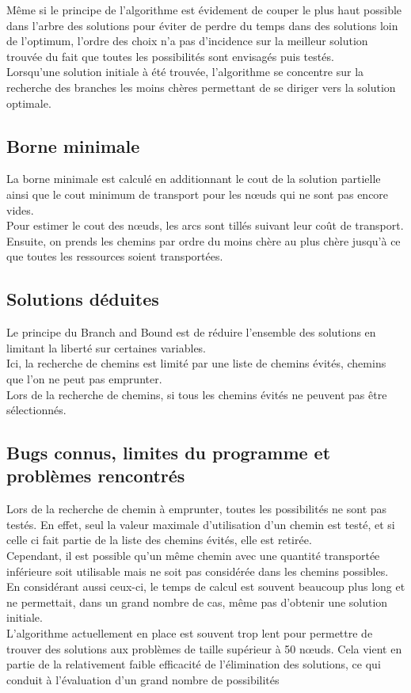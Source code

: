 \documentclass[a4paper, 12pt]{report}
\begin{document}
Même si le principe de l'algorithme est évidement de couper le plus haut possible dans l'arbre des solutions 
pour éviter de perdre du temps dans des solutions loin de l'optimum, 
l'ordre des choix n'a pas d'incidence sur la meilleur solution trouvée 
du fait que toutes les possibilités sont envisagés puis testés.\\

Lorsqu'une solution initiale à été trouvée, l'algorithme se concentre sur la recherche des branches les moins chères
permettant de se diriger vers la solution optimale.

\subsection{Borne minimale}
La borne minimale est calculé en additionnant le cout de la solution partielle ainsi que le cout minimum de transport pour les nœuds qui ne sont pas encore vides. \\
Pour estimer le cout des nœuds, les arcs sont tillés suivant leur coût de transport. 
Ensuite, on prends les chemins par ordre du moins chère au plus chère
jusqu'à ce que toutes les ressources soient transportées. 

\subsection{Solutions déduites}
Le principe du Branch and Bound est de réduire l'ensemble des solutions en limitant la liberté sur certaines variables. \\
Ici, la recherche de chemins est limité par une liste de chemins évités, chemins que l'on ne peut pas emprunter.\\
Lors de la recherche de chemins, si tous les chemins évités ne  peuvent pas être sélectionnés. 

\subsection{Bugs connus, limites du programme et problèmes rencontrés}
Lors de la recherche de chemin à emprunter, toutes les possibilités ne sont pas testés.
En effet, seul la valeur maximale d'utilisation d'un chemin est testé, 
et si celle ci fait partie de la liste des chemins évités, elle est retirée. \\
Cependant, il est possible qu'un même chemin avec une quantité transportée inférieure
soit utilisable mais ne soit pas considérée dans les chemins possibles.\\
En considérant aussi ceux-ci, le temps de calcul est souvent beaucoup plus long et ne permettait,
dans un grand nombre de cas, même pas d'obtenir une solution initiale. \\ \hbox

L'algorithme actuellement en place est souvent trop lent pour permettre de trouver des solutions 
aux problèmes de taille supérieur à 50 nœuds. 
Cela vient en partie de la relativement faible efficacité de l'élimination des solutions, 
ce qui conduit à l'évaluation d'un grand nombre de possibilités
\end{document}
